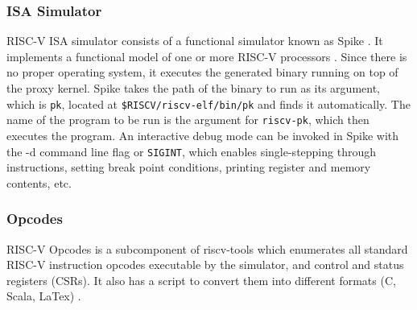 \subsubsection{ISA Simulator}
 \label{sect6_2_1_4}
RISC-V ISA simulator consists of a functional simulator known as Spike \cite{riscv_soft_tools}. It implements a functional model of one or more RISC-V processors \cite{riscv_isa}. Since there is no proper operating system, it executes the generated binary running on top of the proxy kernel. \newline\newline
Spike takes the path of the binary to run as its argument, which is \verb|pk|, located at \verb|$RISCV/riscv-elf/bin/pk| and finds it automatically. The name of the program to be run is the argument for \verb|riscv-pk|, which then executes the program. An interactive debug mode can be invoked in Spike with the -d command line flag or \verb|SIGINT|, which enables single-stepping through instructions, setting break point conditions, printing register and memory contents, etc.

\subsubsection{Opcodes}
 \label{sect6_2_1_5}
RISC-V Opcodes is a subcomponent of riscv-tools which enumerates all standard RISC-V instruction opcodes executable by the simulator, and control and status registers (CSRs). It also has a script to convert them into different formats (C, Scala, LaTex) \cite{riscv_opcodes}.

